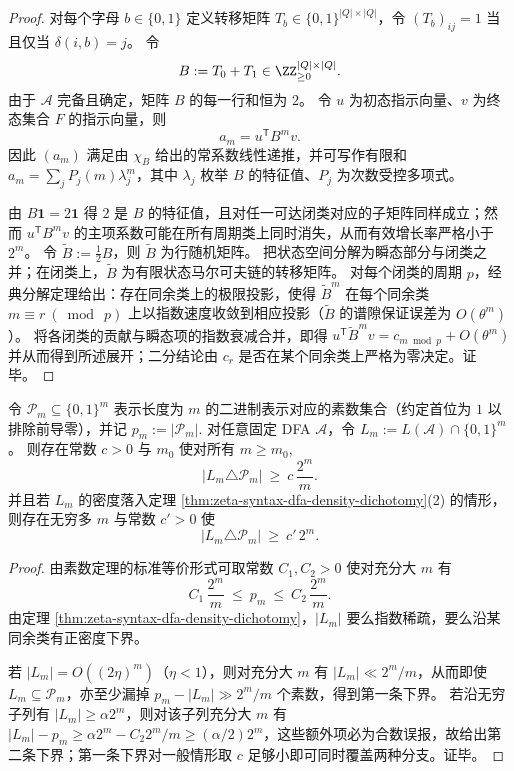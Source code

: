 \begin{proof}
对每个字母 \(b\in\{0,1\}\) 定义转移矩阵 \(T_b\in\{0,1\}^{|Q|\times|Q|}\)，令 \((T_b)_{ij}=1\) 当且仅当 \(\delta(i,b)=j\)。
令
\[
B:=T_0+T_1\in \ZZ_{\ge 0}^{|Q|\times|Q|}.
\]
由于 \(\mathcal A\) 完备且确定，矩阵 \(B\) 的每一行和恒为 \(2\)。
令 \(u\) 为初态指示向量、\(v\) 为终态集合 \(F\) 的指示向量，则
\[
a_m=u^{\mathsf T}B^m v.
\]
因此 \((a_m)\) 满足由 \(\chi_B\) 给出的常系数线性递推，并可写作有限和
\(
a_m=\sum_j P_j(m)\lambda_j^m
\)，其中 \(\lambda_j\) 枚举 \(B\) 的特征值、\(P_j\) 为次数受控多项式。
\par
由 \(B\mathbf 1=2\mathbf 1\) 得 \(2\) 是 \(B\) 的特征值，且对任一可达闭类对应的子矩阵同样成立；然而 \(u^{\mathsf T}B^m v\) 的主项系数可能在所有周期类上同时消失，从而有效增长率严格小于 \(2^m\)。
令 \(\widetilde B:=\tfrac12 B\)，则 \(\widetilde B\) 为行随机矩阵。
把状态空间分解为瞬态部分与闭类之并；在闭类上，\(\widetilde B\) 为有限状态马尔可夫链的转移矩阵。
对每个闭类的周期 \(p\)，经典分解定理给出：存在同余类上的极限投影，使得 \(\widetilde B^m\) 在每个同余类 \(m\equiv r\ (\bmod\ p)\) 上以指数速度收敛到相应投影（\(\widetilde B\) 的谱隙保证误差为 \(O(\theta^m)\)）。
将各闭类的贡献与瞬态项的指数衰减合并，即得
\(
u^{\mathsf T}\widetilde B^m v=c_{m\bmod p}+O(\theta^m)
\)
并从而得到所述展开；二分结论由 \(c_r\) 是否在某个同余类上严格为零决定。证毕。
\end{proof}

\begin{corollary}[有限自动机无法精确识别二进制素数集合]\label{cor:zeta-syntax-dfa-prime-symmetric-diff}
令 \(\mathcal P_m\subseteq\{0,1\}^m\) 表示长度为 \(m\) 的二进制表示对应的素数集合（约定首位为 \(1\) 以排除前导零），并记
\(
p_m:=|\mathcal P_m|.
\)
对任意固定 DFA \(\mathcal A\)，令 \(L_m:=L(\mathcal A)\cap\{0,1\}^m\)。
则存在常数 \(c>0\) 与 \(m_0\) 使对所有 \(m\ge m_0\),
\[
|L_m\triangle \mathcal P_m|\ \ge\ c\,\frac{2^m}{m}.
\]
并且若 \(L_m\) 的密度落入定理 \ref{thm:zeta-syntax-dfa-density-dichotomy}(2) 的情形，则存在无穷多 \(m\) 与常数 \(c'>0\) 使
\[
|L_m\triangle \mathcal P_m|\ \ge\ c'\,2^m.
\]
\end{corollary}
\begin{proof}
由素数定理的标准等价形式可取常数 \(C_1,C_2>0\) 使对充分大 \(m\) 有
\[
C_1\,\frac{2^m}{m}\ \le\ p_m\ \le\ C_2\,\frac{2^m}{m}.
\]
由定理 \ref{thm:zeta-syntax-dfa-density-dichotomy}，\(|L_m|\) 要么指数稀疏，要么沿某同余类有正密度下界。
\par
若 \(|L_m|=O((2\eta)^m)\)（\(\eta<1\)），则对充分大 \(m\) 有 \(|L_m|\ll 2^m/m\)，从而即使 \(L_m\subseteq\mathcal P_m\)，亦至少漏掉 \(p_m-|L_m|\gg 2^m/m\) 个素数，得到第一条下界。
若沿无穷子列有 \(|L_m|\ge \alpha 2^m\)，则对该子列充分大 \(m\) 有
\(
|L_m|-p_m\ge \alpha 2^m-C_2 2^m/m\ge (\alpha/2)2^m
\)，这些额外项必为合数误报，故给出第二条下界；第一条下界对一般情形取 \(c\) 足够小即可同时覆盖两种分支。证毕。
\end{proof}


